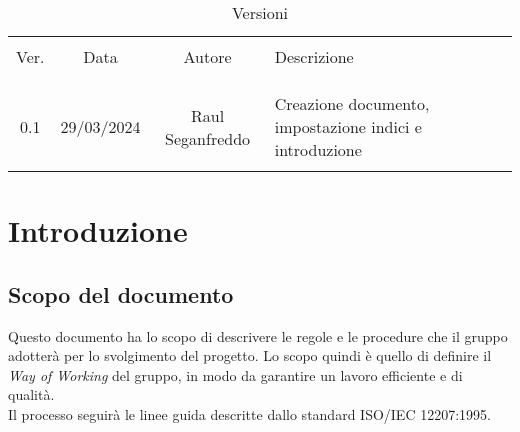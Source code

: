 \documentclass[italian,12pt]{article} %
\begin{document}


\newpage



\begin{table}[!h]
	\caption{Versioni}
	\begin{center}
		\begin{tabular}{ c c c p{9cm} }
			\hline\\[-2ex]
			Ver. & Data       & Autore             & Descrizione\\
			\\[-2ex] \hline \\[-1.5ex] \\
			0.1  & 29/03/2024 & Raul Seganfreddo & Creazione documento, impostazione indici e introduzione\\
			\\[-1.5ex] \hline
		\end{tabular}
	\end{center}
\end{table}

\newpage

\tableofcontents

\newpage

\section{Introduzione}
\subsection{Scopo del documento}
Questo documento ha lo scopo di descrivere le regole e le procedure che il gruppo adotterà per lo svolgimento del progetto. Lo scopo quindi è quello di definire il \textit{Way of Working} del gruppo, in modo da garantire un lavoro efficiente e di qualità.\\
Il processo seguirà le linee guida descritte dallo standard ISO/IEC 12207:1995.
\end{document}
